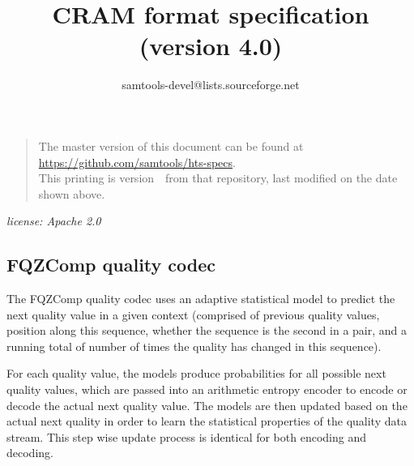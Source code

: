\documentclass[a4paper]{article}
\begin{document}


\title{CRAM format specification (version 4.0)}
\author{samtools-devel@lists.sourceforge.net}
\date{\headdate}
\maketitle


\begin{quote}\small
The master version of this document can be found at
\url{https://github.com/samtools/hts-specs}.\\
This printing is version~\commitdesc\ from that repository,
last modified on the date shown above.
\end{quote}

\begin{center}
\textit{license: Apache 2.0}
\end{center}
\vspace*{1em}

\newlength{\maxwidth}
\newcommand{\algalign}[2] %
{\makebox[\maxwidth][l]{$#1{}$}${}#2$}

\makeatletter
\newcommand*{\bdiv}{%
  \nonscript\mskip-\medmuskip\mkern5mu%
  \mathbin{\operator@font div}\penalty900\mkern5mu%
  \nonscript\mskip-\medmuskip
}
\newcommand*{\bitand}{%
  \nonscript\mskip-\medmuskip\mkern5mu%
  \mathbin{\operator@font AND}\penalty900\mkern5mu%
  \nonscript\mskip-\medmuskip
}
\newcommand*{\bitor}{%
  \nonscript\mskip-\medmuskip\mkern5mu%
  \mathbin{\operator@font OR}\penalty900\mkern5mu%
  \nonscript\mskip-\medmuskip
}
\newcommand*{\bitxor}{%
  \nonscript\mskip-\medmuskip\mkern5mu%
  \mathbin{\operator@font XOR}\penalty900\mkern5mu%
  \nonscript\mskip-\medmuskip
}
\makeatother

\subsection*{FQZComp quality codec}

The FQZComp quality codec uses an adaptive statistical model to
predict the next quality value in a given context (comprised of
previous quality values, position along this sequence, whether the
sequence is the second in a pair, and a running total of number of
times the quality has changed in this sequence).

For each quality value, the models produce probabilities for all
possible next quality values, which are passed into an arithmetic
entropy encoder to encode or decode the actual next quality value.
The models are then updated based on the actual next quality in order
to learn the statistical properties of the quality data stream.  This
step wise update process is identical for both encoding and decoding.
\end{document}

